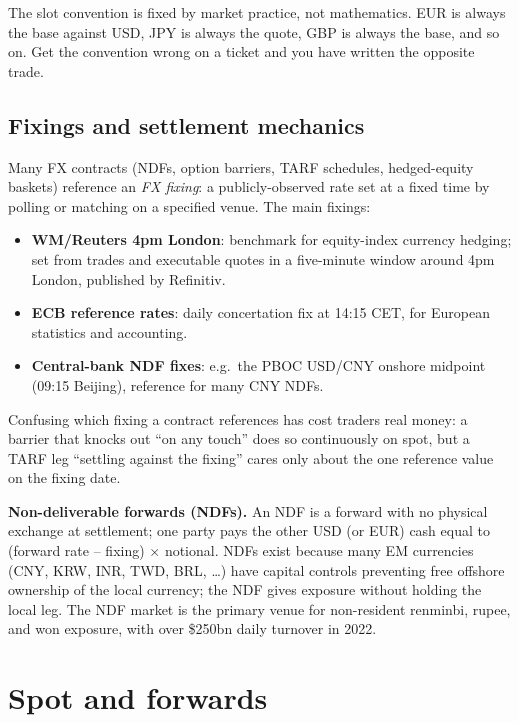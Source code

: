 The slot convention is fixed by market practice, not mathematics.
EUR is always the base against USD, JPY is always the quote, GBP is
always the base, and so on.  Get the convention wrong on a ticket
and you have written the opposite trade.

\subsection{Fixings and settlement mechanics}
\label{subsec:fx_fixings}

Many FX contracts (NDFs, option barriers, TARF schedules,
hedged-equity baskets) reference an \emph{FX fixing}: a
publicly-observed rate set at a fixed time by polling or matching
on a specified venue.  The main fixings:
\begin{itemize}
  \item \textbf{WM/Reuters 4pm London}: benchmark for equity-index
    currency hedging; set from trades and executable quotes in a
    five-minute window around 4pm London, published by Refinitiv.
  \item \textbf{ECB reference rates}: daily concertation fix at
    14:15 CET, for European statistics and accounting.
  \item \textbf{Central-bank NDF fixes}: e.g.\ the PBOC USD/CNY
    onshore midpoint (09:15 Beijing), reference for many CNY NDFs.
\end{itemize}
Confusing which fixing a contract references has cost traders real
money: a barrier that knocks out ``on any touch'' does so
continuously on spot, but a TARF leg ``settling against the fixing''
cares only about the one reference value on the fixing date.

\textbf{Non-deliverable forwards (NDFs).}
An NDF is a forward with no physical exchange at settlement; one
party pays the other USD (or EUR) cash equal to (forward rate --
fixing) $\times$ notional.  NDFs exist because many EM currencies
(CNY, KRW, INR, TWD, BRL, \ldots) have capital controls preventing
free offshore ownership of the local currency; the NDF gives
exposure without holding the local leg.  The NDF market is the
primary venue for non-resident renminbi, rupee, and won exposure,
with over \$250bn daily turnover in 2022.


\section{Spot and forwards}
\label{sec:fx_spot_forward}

